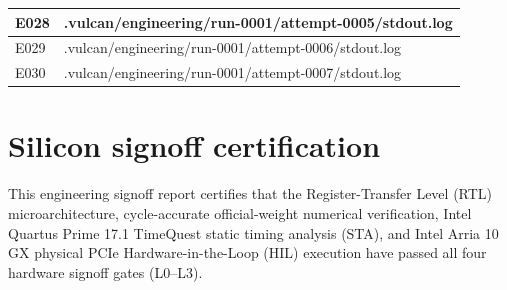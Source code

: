 \documentclass[11pt,a4paper]{article}
\begin{document}
{\begin{longtable}{@{}L{0.12\textwidth}|L{0.82\textwidth}@{}}
E028 & .vulcan/\allowbreak{}engineering/\allowbreak{}run-0001/\allowbreak{}attempt-0005/\allowbreak{}stdout.log\\[2pt]\hline

E029 & .vulcan/\allowbreak{}engineering/\allowbreak{}run-0001/\allowbreak{}attempt-0006/\allowbreak{}stdout.log\\[2pt]\hline

E030 & .vulcan/\allowbreak{}engineering/\allowbreak{}run-0001/\allowbreak{}attempt-0007/\allowbreak{}stdout.log\\[2pt]\hline

\bottomrule\end{longtable}}

\section{Silicon signoff certification}

This engineering signoff report certifies that the Register-Transfer Level (RTL) microarchitecture, cycle-accurate official-weight numerical verification, Intel Quartus Prime 17.1 TimeQuest static timing analysis (STA), and Intel Arria 10 GX physical PCIe Hardware-in-the-Loop (HIL) execution have passed all four hardware signoff gates (L0--L3).
\end{document}
